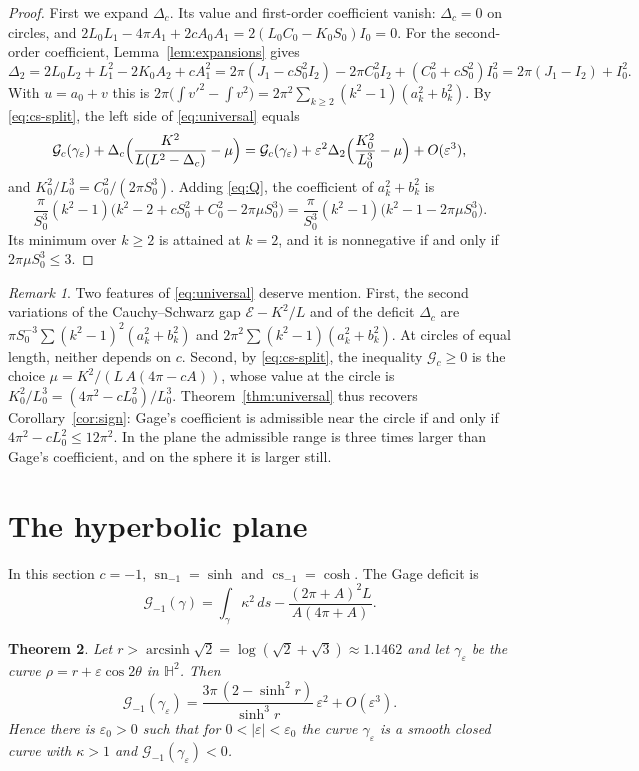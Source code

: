 \documentclass[11pt]{amsart}
\newtheorem{theorem}{Theorem}[section]
\theoremstyle{definition}
\theoremstyle{remark}
\newtheorem{remark}[theorem]{Remark}
\numberwithin{equation}{section}
\DeclareMathOperator{\sn}{sn}
\DeclareMathOperator{\cs}{cs}
\DeclareMathOperator{\arcsinh}{arcsinh}
\newcommand{\HH}{\mathbb{H}}
\newcommand{\eps}{\varepsilon}
\newcommand{\E}{\mathcal{E}}
\newcommand{\G}{\mathcal{G}}
\begin{document}
\begin{proof}
First we expand $\Delta_c$. Its value and first-order coefficient vanish: $\Delta_c=0$ on circles, and $2L_0L_1-4\pi A_1+2cA_0A_1=2(L_0C_0-K_0S_0)I_0=0$. For the second-order coefficient, Lemma~\ref{lem:expansions} gives
\[
\Delta_2=2L_0L_2+L_1^2-2K_0A_2+cA_1^2=2\pi(J_1-cS_0^2I_2)-2\pi C_0^2I_2+(C_0^2+cS_0^2)I_0^2=2\pi(J_1-I_2)+I_0^2 .
\]
With $u=a_0+v$ this is $2\pi\bigl(\int v'^2-\int v^2\bigr)=2\pi^2\sum_{k\ge2}(k^2-1)(a_k^2+b_k^2)$. By \eqref{eq:cs-split}, the left side of \eqref{eq:universal} equals
\[
\G_c(\gamma_\eps)+\Delta_c\Bigl(\frac{K^2}{L(L^2-\Delta_c)}-\mu\Bigr)
=\G_c(\gamma_\eps)+\eps^2\Delta_2\Bigl(\frac{K_0^2}{L_0^3}-\mu\Bigr)+O(\eps^3),
\]
and $K_0^2/L_0^3=C_0^2/(2\pi S_0^3)$. Adding \eqref{eq:Q}, the coefficient of $a_k^2+b_k^2$ is
\[
\frac{\pi}{S_0^3}(k^2-1)\bigl(k^2-2+cS_0^2+C_0^2-2\pi\mu S_0^3\bigr)=\frac{\pi}{S_0^3}(k^2-1)\bigl(k^2-1-2\pi\mu S_0^3\bigr).
\]
Its minimum over $k\ge2$ is attained at $k=2$, and it is nonnegative if and only if $2\pi\mu S_0^3\le3$.
\end{proof}

\begin{remark}\label{rem:universal}
Two features of \eqref{eq:universal} deserve mention. First, the second variations of the Cauchy--Schwarz gap $\E-K^2/L$ and of the deficit $\Delta_c$ are $\pi S_0^{-3}\sum(k^2-1)^2(a_k^2+b_k^2)$ and $2\pi^2\sum(k^2-1)(a_k^2+b_k^2)$. At circles of equal length, neither depends on $c$. Second, by \eqref{eq:cs-split}, the inequality $\G_c\ge0$ is the choice $\mu=K^2/(L\,A(4\pi-cA))$, whose value at the circle is $K_0^2/L_0^3=(4\pi^2-cL_0^2)/L_0^3$. Theorem~\ref{thm:universal} thus recovers Corollary~\ref{cor:sign}: Gage's coefficient is admissible near the circle if and only if $4\pi^2-cL_0^2\le12\pi^2$. In the plane the admissible range is three times larger than Gage's coefficient, and on the sphere it is larger still.
\end{remark}

\section{The hyperbolic plane}\label{sec:hyperbolic}

In this section $c=-1$, $\sn_{-1}=\sinh$ and $\cs_{-1}=\cosh$. The Gage deficit is
\[
\G_{-1}(\gamma)=\int_\gamma\kappa^2\,ds-\frac{(2\pi+A)^2L}{A(4\pi+A)}.
\]

\begin{theorem}\label{thm:hyp}
Let $r>\arcsinh\sqrt2=\log(\sqrt2+\sqrt3)\approx1.1462$ and let $\gamma_\eps$ be the curve $\rho=r+\eps\cos2\theta$ in $\HH^2$. Then
\[
\G_{-1}(\gamma_\eps)=\frac{3\pi\,(2-\sinh^2r)}{\sinh^3r}\,\eps^2+O(\eps^3).
\]
Hence there is $\eps_0>0$ such that for $0<|\eps|<\eps_0$ the curve $\gamma_\eps$ is a smooth closed curve with $\kappa>1$ and $\G_{-1}(\gamma_\eps)<0$.
\end{theorem}
\end{document}
